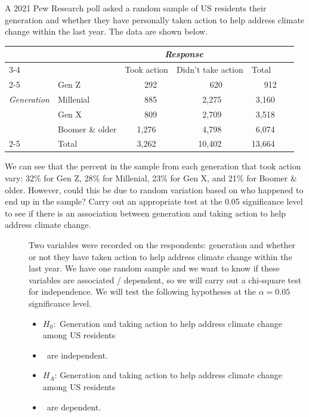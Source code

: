 \begin{examplewrap}
\begin{nexample}{A 2021 Pew Research poll asked a random sample of US residents their generation and whether they have personally taken action to help address climate change within the last year.  The data are shown below.
\label{generationclimate}
\begin{center}
\begin{tabular}{l l c c ll}
								&			& \multicolumn{2}{c}{\textit{Response}}	& &\hspace{10mm}\ 		\\
\cline{3-4}
								&			& Took action		& Didn't take action		& Total	\\
\cline{2-5}
								& Gen Z		& \ \ 292		& \ \ \ 620		&  \ \ \ 912	\\
\textit{Generation}					& Millenial			& \ \ 885			& \ 2,275 			& \ 3,160	\\
								& Gen X			& \ \ 809			& \ 2,709 			& \ 3,518	\\
								& Boomer \& older	& 1,276			& \ 4,798 			& \ 6,074	\\
\cline{2-5}
								& Total		& 3,262		& 10,402		& 13,664
\end{tabular}
\end{center}
We can see that the percent in the sample from each generation that took action vary:  32\% for Gen Z, 28\% for Millenial, 23\% for Gen X, and 21\% for Boomer \& older.  However, could this be due to random variation based on who happened to end up in the sample?  Carry out an appropriate test at the 0.05 significance level to see if there is an association between generation and taking action to help address climate change.}
\begin{description}
\item[] Two variables were recorded on the respondents: generation and whether or not they have taken action to help address climate change within the last year.  We have one random sample and we want to know if these variables are associated / dependent, so we will carry out a chi-square test for independence.  We will test the following hypotheses at the $\alpha=0.05$ significance level.  
\begin{itemize}
\setlength{\itemsep}{0mm}
\item[]$H_0$: \,Generation and taking action to help address climate change among US residents
\item[] \qquad \ are \mbox{independent.}
\item[]$H_A$: Generation and taking action to help address climate change among US residents 
\item[] \qquad \ are \mbox{dependent.}
\end{itemize}


\end{description}
\end{nexample}
\end{examplewrap}
